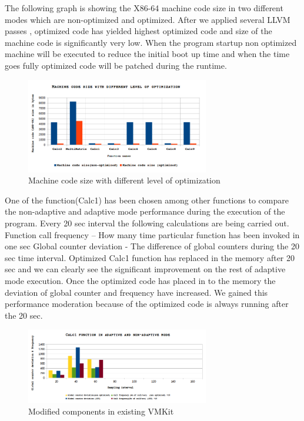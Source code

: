 The following graph is showing the X86-64 machine code size in two different modes which are non-optimized and optimized. After we applied several LLVM passes , optimized code has yielded highest optimized code and size of the machine code is significantly very low. When the program startup non optimized machine will be executed to reduce the initial boot up time and when the time goes fully optimized code will be patched during the runtime.
\begin{figure}[ht!]
\centering
\includegraphics[width=80mm]{graph1.png}
\caption{\small Machine code size with different level of optimization}
\label{fig:machinecodesize}
\end{figure}
One of the function(Calc1) has been chosen among other functions to compare the non-adaptive and adaptive mode performance during the execution of the program. Every 20 sec interval the following calculations are being carried out.
Function call frequency – How many time particular function has been invoked in one sec
Global counter deviation -  The difference of global counters during the 20 sec time interval.
Optimized Calc1 function has replaced in the memory after 20 sec and we can clearly see the significant improvement on the rest of adaptive mode execution. Once the optimized code has  placed in to the memory the deviation of global counter and frequency  have increased. We gained this performance moderation because of the optimized code is always running after the 20 sec.
\begin{figure}[ht!]
\centering
\includegraphics[width=80mm]{graph2.png}
\caption{\small Modified components in existing VMKit}
\label{fig:calc1}
\end{figure}


